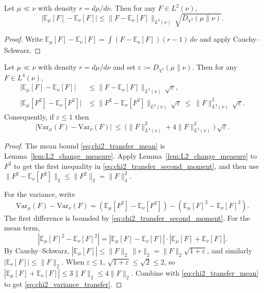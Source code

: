 \begin{lemma}\label{lem:L2_change_measure}
Let $\mu\ll\nu$ with density $r=d\mu/d\nu$.
Then for any $F\in L^2(\nu)$,
\begin{equation}\label{eq:change_measure_bound}
\bigl|\mathbb E_{\mu}[F]-\mathbb E_{\nu}[F]\bigr|
\le
\|F-\mathbb E_{\nu}[F]\|_{L^2(\nu)}\,\sqrt{D_{\chi^2}(\mu\|\nu)}.
\end{equation}
\end{lemma}

\begin{proof}
Write $\mathbb E_{\mu}[F]-\mathbb E_{\nu}[F]=\int (F-\mathbb E_{\nu}[F])(r-1)\,d\nu$ and apply Cauchy--Schwarz.
\end{proof}

\begin{lemma}\label{lem:chi2_transfer_variance}
Let $\mu\ll\nu$ with density $r=d\mu/d\nu$ and set $\varepsilon:=D_{\chi^2}(\mu\|\nu)$.
Then for any $F\in L^4(\nu)$,
\begin{align}
\bigl|\mathbb E_{\mu}[F]-\mathbb E_{\nu}[F]\bigr|
&\le
\|F-\mathbb E_{\nu}[F]\|_{L^2(\nu)}\,\sqrt{\varepsilon},
\label{eq:chi2_transfer_mean}
\\
\bigl|\mathbb E_{\mu}[F^2]-\mathbb E_{\nu}[F^2]\bigr|
&\le
\|F^2-\mathbb E_{\nu}[F^2]\|_{L^2(\nu)}\,\sqrt{\varepsilon}
\ \le\ 
\|F\|_{L^4(\nu)}^2\,\sqrt{\varepsilon}.
\label{eq:chi2_transfer_second_moment}
\end{align}
Consequently, if $\varepsilon\le 1$ then
\begin{equation}\label{eq:chi2_variance_transfer}
\bigl|\mathrm{Var}_{\mu}(F)-\mathrm{Var}_{\nu}(F)\bigr|
\ \le\
\bigl(\|F\|_{L^4(\nu)}^2 + 4\|F\|_{L^2(\nu)}^2\bigr)\,\sqrt{\varepsilon}.
\end{equation}
\end{lemma}

\begin{proof}
The mean bound \eqref{eq:chi2_transfer_mean} is Lemma~\ref{lem:L2_change_measure}.
Apply Lemma~\ref{lem:L2_change_measure} to $F^2$ to get the first inequality in \eqref{eq:chi2_transfer_second_moment}, and then use
$\|F^2-\mathbb E_{\nu}[F^2]\|_2\le \|F^2\|_2=\|F\|_4^2$.

For the variance, write
\[
\mathrm{Var}_{\mu}(F)-\mathrm{Var}_{\nu}(F)
=
(\mathbb E_{\mu}[F^2]-\mathbb E_{\nu}[F^2])
-(\mathbb E_{\mu}[F]^2-\mathbb E_{\nu}[F]^2).
\]
The first difference is bounded by \eqref{eq:chi2_transfer_second_moment}.
For the mean term,
\[
|\mathbb E_{\mu}[F]^2-\mathbb E_{\nu}[F]^2|
=
|\mathbb E_{\mu}[F]-\mathbb E_{\nu}[F]|\cdot|\mathbb E_{\mu}[F]+\mathbb E_{\nu}[F]|.
\]
By Cauchy--Schwarz,
$|\mathbb E_{\mu}[F]|\le \|F\|_{2}\,\|r\|_{2}=\|F\|_{2}\sqrt{1+\varepsilon}$,
and similarly $|\mathbb E_{\nu}[F]|\le \|F\|_{2}$.
When $\varepsilon\le 1$, $\sqrt{1+\varepsilon}\le \sqrt 2\le 2$, so
$|\mathbb E_{\mu}[F]+\mathbb E_{\nu}[F]|\le 3\|F\|_{2}\le 4\|F\|_{2}$.
Combine with \eqref{eq:chi2_transfer_mean} to get \eqref{eq:chi2_variance_transfer}.
\end{proof}

